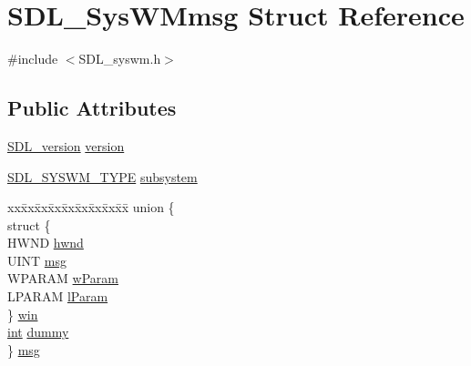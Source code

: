\hypertarget{struct_s_d_l___sys_w_mmsg}{}\section{S\+D\+L\+\_\+\+Sys\+W\+Mmsg Struct Reference}
\label{struct_s_d_l___sys_w_mmsg}


{\ttfamily \#include $<$S\+D\+L\+\_\+syswm.\+h$>$}

\subsection*{Public Attributes}
\begin{DoxyCompactItemize}
\item 
\mbox{\hyperlink{struct_s_d_l__version}{S\+D\+L\+\_\+version}} \mbox{\hyperlink{struct_s_d_l___sys_w_mmsg_a95f9aae58d18ee8fac556416b322a5fb}{version}}
\item 
\mbox{\hyperlink{_s_d_l__syswm_8h_a064c26598287280fff2a00d6758ac4f7}{S\+D\+L\+\_\+\+S\+Y\+S\+W\+M\+\_\+\+T\+Y\+PE}} \mbox{\hyperlink{struct_s_d_l___sys_w_mmsg_a7c3900af5ea797f1318fc77ee0ecd11b}{subsystem}}
\item 
\begin{tabbing}
xx\=xx\=xx\=xx\=xx\=xx\=xx\=xx\=xx\=\kill
union \{\\
\>struct \{\\
\>\>HWND \mbox{\hyperlink{struct_s_d_l___sys_w_mmsg_a55cf9583b5eddfe60a5c9851f9cce457}{hwnd}}\\
\>\>UINT \mbox{\hyperlink{struct_s_d_l___sys_w_mmsg_a74894ed060d5508ab06aac584154d61e}{msg}}\\
\>\>WPARAM \mbox{\hyperlink{struct_s_d_l___sys_w_mmsg_a7463730478d90ebc031d83098f3f74fc}{wParam}}\\
\>\>LPARAM \mbox{\hyperlink{struct_s_d_l___sys_w_mmsg_a24c1e4c3cb8d9781d34e5d99df66ac36}{lParam}}\\
\>\} \mbox{\hyperlink{struct_s_d_l___sys_w_mmsg_a40eda8f5b8653f96438319efee6e3d7a}{win}}\\
\>\mbox{\hyperlink{warnings_8h_a74f207b5aa4ba51c3a2ad59b219a423b}{int}} \mbox{\hyperlink{struct_s_d_l___sys_w_mmsg_a8faf13f90f2477157b42b631308cd900}{dummy}}\\
\} \mbox{\hyperlink{struct_s_d_l___sys_w_mmsg_a0b25f8181cc5d1b79e0bb3574493ead3}{msg}}\\

\end{tabbing}\end{DoxyCompactItemize}


